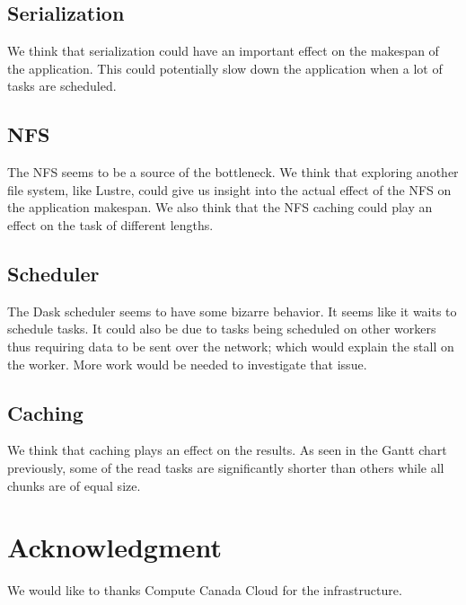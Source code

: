 \documentclass[conference]{IEEEtran}
\begin{document}
\subsection{Serialization}
We think that serialization could have an important effect on the makespan of the
application. This could potentially slow down the application when a lot of tasks are
scheduled.

\subsection{NFS}
The NFS seems to be a source of the bottleneck. We think that exploring another file
system, like Lustre, could give us insight into the actual effect of the NFS on the
application makespan. We also think that the NFS caching could play an effect on the
task of different lengths.

\subsection{Scheduler}
The Dask scheduler seems to have some bizarre behavior. It seems like it waits to
schedule tasks. It could also be due to tasks being scheduled on other workers
thus requiring data to be sent over the network; which would explain the stall on the
worker. More work would be needed to investigate that issue.


\subsection{Caching}
We think that caching plays an effect on the results. As seen in the Gantt chart
previously, some of the read tasks are significantly shorter than others while all
chunks are of equal size.

\section*{Acknowledgment}

We would like to thanks Compute Canada Cloud for the infrastructure.



\end{document}
